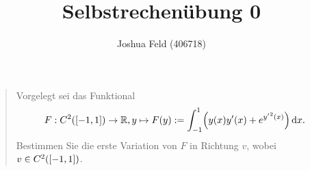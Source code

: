 \documentclass{exercise}
\title{Selbstrechenübung 0}
\author{Joshua Feld (406718)}
\begin{document}
	\maketitle


	\section{}

	\begin{quote}
		Vorgelegt sei das Funktional
		\[
			F: C^2\parentheses*{\brackets*{-1, 1}} \to \R, y \mapsto F\parentheses*{y} := \int_{-1}^1 \parentheses*{y\parentheses*{x}y'\parentheses*{x} + e^{{y'}^2\parentheses*{x}}}\d x.
		\]
		Bestimmen Sie die erste Variation von \(F\) in Richtung \(v\), wobei \(v \in C^2\parentheses*{\brackets*{-1, 1}}\).
	\end{quote}
\end{document}
